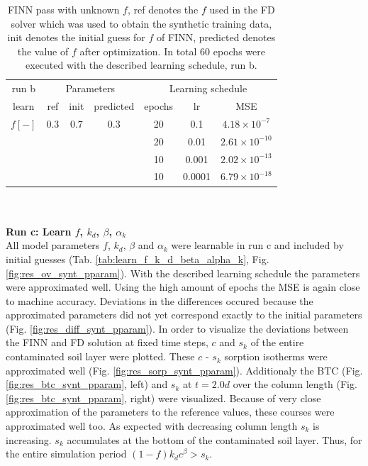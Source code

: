 \begin{table}[h!]
    \centering
    \begin{tabular}{c|ccc||ccc}
         run b& \multicolumn{3}{c}{Parameters}& \multicolumn{3}{c}{Learning schedule} \\
          learn & ref & init & predicted & epochs & lr & MSE \\[0.2 cm] \hline
         $f[-]$ & 0.3 & 0.7 & 0.3 & 20 & 0.1 & $4.18 \times 10^{-7}$ \\
         \quad & \quad & \quad & \quad & 20 & 0.01 & $2.61 \times 10^{-10}$\\
         \quad & \quad & \quad & \quad & 10 & 0.001 & $2.02 \times 10^{-13}$\\
         \quad & \quad & \quad & \quad & 10 & 0.0001 & $6.79 \times 10^{-18}$\\
    \end{tabular}
    \caption[FINN pass with unknown $f$, run b]{FINN pass with unknown $f$, ref denotes the $f$ used in the FD solver which was used to obtain the synthetic training data, init denotes the initial guess for $f$ of FINN, predicted denotes the value of $f$ after optimization. In total 60 epochs were executed with the described learning schedule, run b.}
    \label{table:learn_f}
\end{table}
\FloatBarrier
\\
\\
\textbf{Run c: Learn $f$, $k_d$, $\beta$, $\alpha_k$}
\\
All model parameters $f$, $k_d$, $\beta$ and $\alpha_k$ were learnable in run c and included by initial guesses (Tab. \ref{tab:learn_f_k_d_beta_alpha_k}, Fig. \ref{fig:res_ov_synt_pparam}). With the described learning schedule the parameters were approximated well. Using the high amount of epochs the MSE is again close to machine accuracy. Deviations in the differences occured because the approximated parameters did not yet correspond exactly to the initial parameters (Fig. \ref{fig:res_diff_synt_pparam}). In order to visualize the deviations between the FINN and FD solution at fixed time steps, $c$ and $s_k$ of the entire contaminated soil layer were plotted.  These $c$ - $s_k$ sorption isotherms were approximated well (Fig. \ref{fig:res_sorp_synt_pparam}). Additionaly the BTC (Fig. \ref{fig:res_btc_synt_pparam}, left) and $s_k$ at $t=2.0d$ over the column length (Fig. \ref{fig:res_btc_synt_pparam}, right) were visualized. Because of very close approximation of the parameters to the reference values, these courses were approximated well too. As expected with decreasing column length $s_k$ is increasing. $s_k$ accumulates at the bottom of the contaminated soil layer. Thus, for the entire simulation period $(1-f)k_dc^\beta > s_k$.
